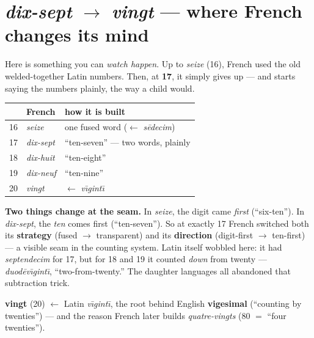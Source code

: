 \section[\emph{dix-sept} to \emph{vingt}]{\emph{dix-sept} $\to$ \emph{vingt} --- where French changes its mind}
\label{lesson:nombres-17-20}

Here is something you can \emph{watch happen}. Up to \emph{seize} (16), French
used the old welded-together Latin numbers. Then, at \textbf{17}, it simply
gives up --- and starts saying the numbers plainly, the way a child would.

\begin{center}
\begin{tabular}{@{}lll@{}}
\toprule
& French & how it is built \\
\midrule
16 & \emph{seize} & one fused word ($\leftarrow$ \emph{s\=edecim}) \\
17 & \emph{dix-sept} & ``ten-seven'' --- two words, plainly \\
18 & \emph{dix-huit} & ``ten-eight'' \\
19 & \emph{dix-neuf} & ``ten-nine'' \\
20 & \emph{vingt} & $\leftarrow$ \emph{v\={\i}gint\={\i}} \\
\bottomrule
\end{tabular}
\end{center}

\begin{grammarlens}
\textbf{Two things change at the seam.} In \emph{seize}, the digit came
\emph{first} (``six-ten''). In \emph{dix-sept}, the \emph{ten} comes first
(``ten-seven''). So at exactly 17 French switched both its \textbf{strategy}
(fused $\to$ transparent) and its \textbf{direction} (digit-first $\to$
ten-first) --- a visible seam in the counting system. Latin itself wobbled
here: it had \emph{septendecim} for 17, but for 18 and 19 it counted
\emph{down} from twenty --- \emph{duod\=ev\={\i}gint\={\i}}, ``two-from-twenty.''
The daughter languages all abandoned that subtraction trick.
\end{grammarlens}

\begin{cousinweb}
\textbf{vingt} (20) $\leftarrow$ Latin \emph{v\={\i}gint\={\i}}, the root
behind English \textbf{vigesimal} (``counting by twenties'') --- and the reason
French later builds \emph{quatre-vingts} (80 $=$ ``four twenties'').
\end{cousinweb}
